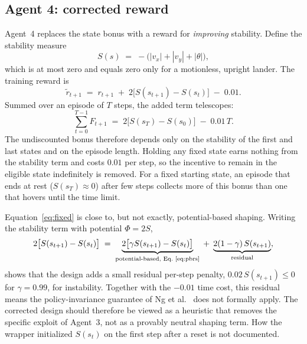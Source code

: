 \documentclass[11pt,a4paper]{article}
\begin{document}
\subsection{Agent 4: corrected reward}

Agent~4 replaces the state bonus with a reward for \emph{improving} stability. Define the stability measure
\begin{equation}
  S(s) \;=\; -\big(|v_x| + |v_y| + |\theta|\big), \label{eq:stability}
\end{equation}
which is at most zero and equals zero only for a motionless, upright lander. The training reward is
\begin{equation}
  \tilde r_{t+1} \;=\; r_{t+1} \;+\; 2\big[S(s_{t+1}) - S(s_t)\big] \;-\; 0.01. \label{eq:fixed}
\end{equation}
Summed over an episode of $T$ steps, the added term telescopes:
\begin{equation}
  \sum_{t=0}^{T-1} F_{t+1} \;=\; 2\big[S(s_T) - S(s_0)\big] \;-\; 0.01\,T. \label{eq:telescope}
\end{equation}
The undiscounted bonus therefore depends only on the stability of the first and last states and on the episode length. Holding any fixed state earns nothing from the stability term and costs $0.01$ per step, so the incentive to remain in the eligible state indefinitely is removed. For a fixed starting state, an episode that ends at rest ($S(s_T)\approx0$) after few steps collects more of this bonus than one that hovers until the time limit.

Equation~\eqref{eq:fixed} is close to, but not exactly, potential-based shaping. Writing the stability term with potential $\Phi = 2S$,
\begin{equation}
  2\big[S(s_{t+1}) - S(s_t)\big] \;=\; \underbrace{2\big[\gamma S(s_{t+1}) - S(s_t)\big]}_{\text{potential-based, Eq.~\eqref{eq:pbrs}}} \;+\; \underbrace{2(1-\gamma)\,S(s_{t+1})}_{\text{residual}}, \label{eq:decomp}
\end{equation}
shows that the design adds a small residual per-step penalty, $0.02\,S(s_{t+1})\leq0$ for $\gamma=0.99$, for instability. Together with the $-0.01$ time cost, this residual means the policy-invariance guarantee of Ng et al.\ \cite{ng1999} does not formally apply. The corrected design should therefore be viewed as a heuristic that removes the specific exploit of Agent~3, not as a provably neutral shaping term. How the wrapper initialized $S(s_t)$ on the first step after a reset is not documented.
\end{document}

